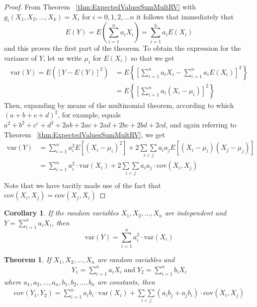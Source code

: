 \documentclass[
10pt,reqno
]{amsart}
\newtheorem{theorem}{Theorem}[section]
\newtheorem{corollary}{Corollary}[section]
\theoremstyle{definition}
\begin{document}
\begin{proof}
From Theorem ~\ref{thm:ExpectedValuesSumMultRV} with \(g_i (X_1, X_2, \ldots, X_k)=X_i\) for \(i=0,1,2, \ldots n \) it follows that immediately that
\[
E(Y)=E \left ( \sum_{i=1}^n a_iX_i \right ) = \sum_{i=1}^n a_i E(X_i)
\]
and this proves the first part of the theorem. To obtain the expression for the variance of \(Y\), let us write \( \mu_i \) for \(E(X_i)\) so that we get
\begin{align*}
\text{var}(Y) = E([Y-E(Y)]^2)&=E \left \{  \left [ \sum_{i=1}^n a_i X_i  - \sum_{i=1}^n a_i E(X_i)\right ]^2 \right \}\\
&=E \left \{  \left [ \sum_{i=1}^n a_i (X_i  - \mu_i)\right ]^2 \right \}
\end{align*}
Then, expanding by means of the multinomial theorem, according to which \((a+b+c+d)^2\), for example, equals \(a^2+b^2+c^c+d^2+2ab+2ac+2ad+2bc+2bd+2cd\), and again referring to Theorem ~\ref{thm:ExpectedValuesSumMultRV}, we get
\begin{align*}
\text{var}(Y) &= \sum_{i=1}^n a_i^2 E[(X_i - \mu_i)^2]+ 2 \underset{i<j}{\sum \sum}a_i a_j E[(X_i - \mu_i)(X_j - \mu_j)]\\
&= \sum_{i=1}^n a_i^2 \cdot \text{var} (X_i)+ 2 \underset{i<j}{\sum \sum}a_i a_j \cdot \text{cov}(X_i,X_j)\\
\end{align*}
Note that we have tacitly made use of the fact that \(\text{cov}(X_i, X_j)=\text{cov}(X_j,X_i)\)
\end{proof}

\begin{corollary}
If the random variables \(X_1, X_2,\ldots,X_n\) are independent and \(Y=\sum_{i=1}^n a_i X_i\), then
\[
\text{var}(Y)=\sum_{i=1}^n a_i^2 \cdot \text{var}(X_i)
\]
\end{corollary}

\begin{theorem}
If \(X_1, X_2,\ldots,X_n\) are random variables and
\begin{align*}
Y_1=\sum_{i=1}^n a_i X_i \; \text{and} \; Y_2=\sum_{i=1}^n b_i X_i
\end{align*}
where \(a_1,a_2,\ldots,a_n,b_1, b_2, \ldots, b_n\) are constants, then
\begin{align*}
\text{cov}(Y_1,Y_2) = \sum_{i=1}^n a_i b_i \cdot \text{var} (X_i)+ \underset{i<j}{\sum \sum}(a_i b_j + a_j b_i) \cdot \text{cov}(X_i,X_j)\\
\end{align*}
\end{theorem}
\end{document}
